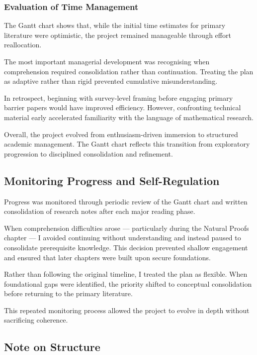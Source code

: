 \documentclass[12pt]{article}
\begin{document}
\subsubsection*{Evaluation of Time Management}

The Gantt chart shows that, while the initial time estimates for primary literature were optimistic, the project remained manageable through effort reallocation.

The most important managerial development was recognising when comprehension required consolidation rather than continuation. Treating the plan as adaptive rather than rigid prevented cumulative misunderstanding.

In retrospect, beginning with survey-level framing before engaging primary barrier papers would have improved efficiency. However, confronting technical material early accelerated familiarity with the language of mathematical research.

Overall, the project evolved from enthusiasm-driven immersion to structured academic management. The Gantt chart reflects this transition from exploratory progression to disciplined consolidation and refinement.

\subsection{Monitoring Progress and Self-Regulation}

Progress was monitored through periodic review of the Gantt chart and written consolidation of research notes after each major reading phase. 

When comprehension difficulties arose --- particularly during the Natural Proofs chapter --- I avoided continuing without understanding and instead paused to consolidate prerequisite knowledge. This decision prevented shallow engagement and ensured that later chapters were built upon secure foundations.

Rather than following the original timeline, I treated the plan as flexible. When foundational gaps were identified, the priority shifted to conceptual consolidation before returning to the primary literature. 

This repeated monitoring process allowed the project to evolve in depth without sacrificing coherence.

\subsection*{Note on Structure}
\end{document}
